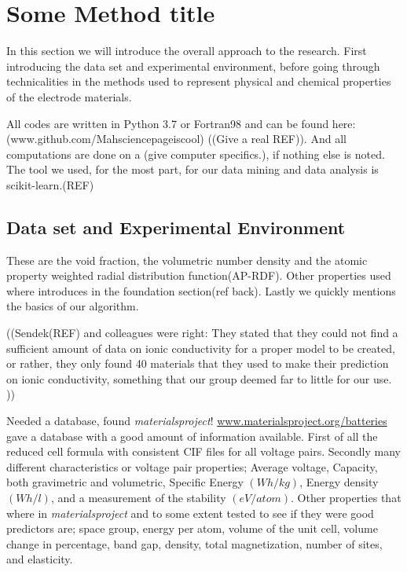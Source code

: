 \section{Some Method title}
In this section we will introduce the overall approach to the research. First introducing the data set and experimental environment, before going through technicalities in the methods used to represent physical and chemical properties of the electrode materials.

All codes are written in Python 3.7 or Fortran98 and can be found here: (www.github.com/Mahsciencepageiscool) ((Give a real REF)). And all computations are done on a (give computer specifics.), if nothing else is noted. The tool we used, for the most part, for our data mining and data analysis is scikit-learn.(REF) 

\subsection{Data set and Experimental Environment}

	 These are the void fraction, the volumetric number density and the atomic property weighted radial distribution function(AP-RDF). Other properties used where introduces in the foundation section(ref back). Lastly we quickly mentions the basics of our algorithm. 

 
	((Sendek(REF) and colleagues were right: They stated that they could not find a sufficient amount of data on ionic conductivity for a proper model to be created, or rather, they only found 40 materials that they used to make their prediction on ionic conductivity, something that our group deemed far to little for our use. ))

	 Needed a database, found \textit{materialsproject}! \url{www.materialsproject.org/batteries} gave a database with a good amount of information available. First of all the reduced cell formula with consistent CIF files for all voltage pairs. Secondly many different characteristics or voltage pair properties; Average voltage, Capacity, both gravimetric and volumetric, Specific Energy $(Wh/kg)$, Energy density $(Wh/ l )$, and a measurement of the stability $(eV/atom)$. Other properties that where in \textit{materialsproject} and to some extent tested to see if they were good predictors are; space group, energy per atom, volume of the unit cell, volume change in percentage, band gap, density, total magnetization, number of sites, and elasticity. 

